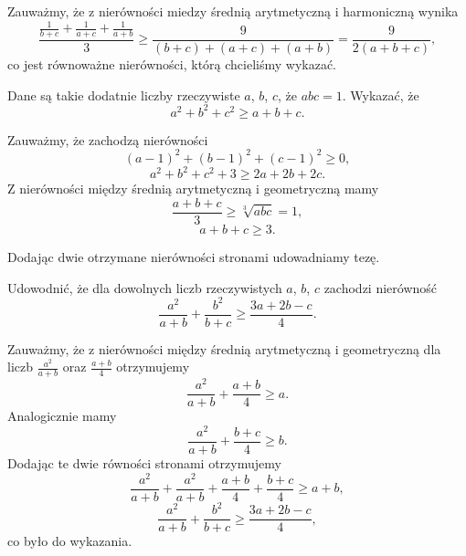 \noindent
Zauważmy, że z nierówności miedzy średnią arytmetyczną i harmoniczną wynika
\[
	\frac{\frac{1}{b + c} + \frac{1}{a + c} + \frac{1}{a + b}}{3} \geqslant \frac{9}{(b + c) + (a + c) + (a + b)} = \frac{9}{2(a + b + c)},
\]
co jest równoważne nierówności, którą chcieliśmy wykazać.

\vspace{5px}

\begin{problem}{4} 
	Dane są takie dodatnie liczby rzeczywiste $a$, $b$, $c$, że $abc = 1$. Wykazać, że
	\[
		a^2 + b^2 + c^2 \geqslant a + b + c.
	\]
\end{problem}

\vspace{5px}

\noindent
Zauważmy, że zachodzą nierówności
\[
	(a - 1)^2 + (b - 1)^2 + (c - 1)^2 \geqslant 0,
\]
\[
	a^2 + b^2 + c^2 + 3 \geqslant 2a + 2b + 2c.
\]
Z nierówności między średnią arytmetyczną i geometryczną mamy
\[
	\frac{a + b + c}{3} \geqslant \sqrt[3]{abc} = 1,
\]
\[
	a + b + c \geqslant 3.
\]

\noindent
Dodając dwie otrzymane nierówności stronami udowadniamy tezę.

\vspace{5px}

\begin{problem}{5} 
	Udowodnić, że dla dowolnych liczb rzeczywistych $a$, $b$, $c$ zachodzi nierówność
	\[
		\frac{a^2}{a + b} + \frac{b^2}{b + c} \geqslant \frac{3a + 2b - c}{4}. 
	\]
\end{problem}

\vspace{5px}

\noindent
Zauważmy, że z nierówności między średnią arytmetyczną i geometryczną dla liczb $\frac{a^2}{a + b}$ oraz $\frac{a + b}{4}$ otrzymujemy
\[
	\frac{a^2}{a + b} + \frac{a + b}{4} \geqslant a.
\]
Analogicznie mamy
\[
	\frac{a^2}{a + b} + \frac{b + c}{4} \geqslant b.
\]
Dodając te dwie równości stronami otrzymujemy
\[
	\frac{a^2}{a + b} + \frac{a^2}{a + b} + \frac{a + b}{4} + \frac{b + c}{4} \geqslant a + b,
\]
\[
	\frac{a^2}{a + b} + \frac{b^2}{b + c} \geqslant \frac{3a + 2b - c}{4},
\]
co było do wykazania.
